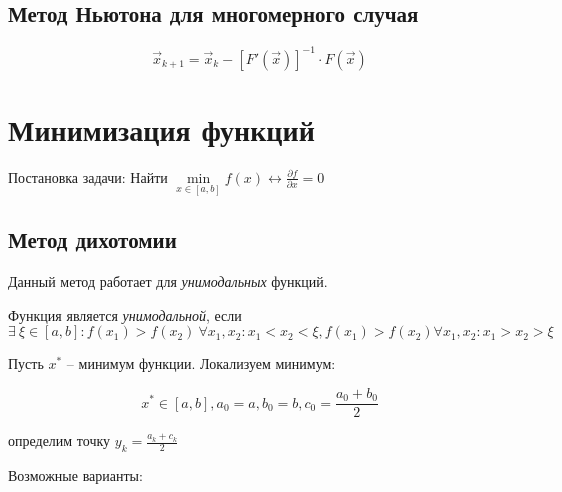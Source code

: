\documentclass[10pt,a4paper]{article}
\begin{document}
		\subsection{Метод Ньютона для многомерного случая}
		
		\begin{equation}
			\vec{x}_{k + 1} = \vec{x}_{k} - 
			\left[F'\left(\vec{x}\right)\right]^{-1}\cdot F\left(\vec{x}\right)
		\end{equation}
		
	\section{Минимизация функций}
	
		Постановка задачи: Найти $\min\limits_{x \in \left[a, b\right]} f\left(x
		\right) \leftrightarrow \frac{\partial f}{\partial x} = 0$
		
		\subsection{Метод дихотомии}
		
			Данный метод работает для \textit{унимодальных} функций.
			
			Функция является \textit{унимодальной}, если $\exists \ \xi \in 
			\left[a, b\right]: f\left(x_{1}\right) > f\left(x_{2}\right) 
			\ \forall x_{1}, x_{2}: x_{1} < x_{2} < \xi, 
			f\left(x_{1}\right) > f\left(x_{2}\right) \forall x_{1}, x_{2}:
			x_{1} > x_{2} > \xi$
			
			Пусть $x^{*}$ -- минимум функции. Локализуем минимум:
			
			\begin{equation}
				x^{*} \in \left[a, b\right], a_{0} = a, b_{0} = b, c_{0} = 
				\frac{a_{0} + b_{0}}{2}
			\end{equation}
			
			определим точку $y_{k} = \frac{a_{k} + c_{k}}{2}$
			
			Возможные варианты:
			
\end{document}
